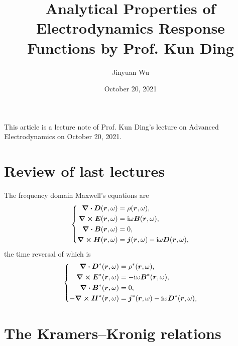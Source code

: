 \documentclass[hyperref, a4paper]{article}
\title{Analytical Properties of Electrodynamics Response Functions by Prof. Kun Ding}
\author{Jinyuan Wu}
\date{October 20, 2021}
\newcommand*{\ii}{\mathrm{i}}
\begin{document}
\maketitle

This article is a lecture note of Prof. Kun Ding's lecture on Advanced Electrodynamics on October 20, 2021.

\section{Review of last lectures}

The frequency domain Maxwell's equations are 
\begin{equation}
    \left\{
        \begin{aligned}
            \div{\vb*{D}}(\vb*{r}, \omega) &= \rho(\vb*{r}, \omega), \\
            \curl{\vb*{E}}(\vb*{r}, \omega) &= \ii \omega \vb*{B}(\vb*{r}, \omega), \\
            \div{\vb*{B}}(\vb*{r}, \omega) &= 0, \\
            \curl{\vb*{H}}(\vb*{r}, \omega) &= \vb*{j}(\vb*{r}, \omega) - \ii \omega \vb*{D}(\vb*{r}, \omega),
        \end{aligned}
    \right.
    \label{eq:maxwell-wave-eqs}
\end{equation}
the time reversal of which is 
\begin{equation}
    \left\{
        \begin{aligned}
            \div{\vb*{D}^*}(\vb*{r}, \omega) &= \rho^*(\vb*{r}, \omega), \\
            \curl{\vb*{E}^*}(\vb*{r}, \omega) &= - \ii \omega \vb*{B}^*(\vb*{r}, \omega), \\
            \div{\vb*{B}^*}(\vb*{r}, \omega) &= 0, \\
            - \curl{\vb*{H}^*}(\vb*{r}, \omega) &= \vb*{j}^*(\vb*{r}, \omega) - \ii \omega \vb*{D}^*(\vb*{r}, \omega),
        \end{aligned}
    \right.
    \label{eq:maxwell-wave-eqs-tr}
\end{equation}

\section{The Kramers–Kronig relations}\label{sec:kk-1}
\end{document}
